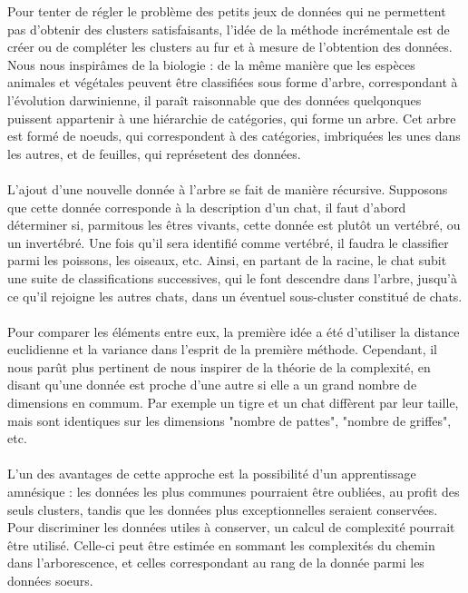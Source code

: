 \documentclass[a4paper,10pt]{article}
\begin{document}
Pour tenter de régler le problème des petits jeux de données qui ne permettent pas d’obtenir des clusters satisfaisants, l’idée de la méthode incrémentale est de créer ou de compléter les clusters au fur et à mesure de l’obtention des données. Nous nous inspirâmes de la biologie : de la même manière que les espèces animales et végétales peuvent être classifiées sous forme d'arbre, correspondant à l'évolution darwinienne, il paraît raisonnable que des données quelqonques puissent appartenir à une hiérarchie de catégories, qui forme un arbre. Cet arbre est formé de noeuds, qui correspondent à des catégories, imbriquées les unes dans les autres, et de feuilles, qui représetent des données.

\paragraph{}

L'ajout d'une nouvelle donnée à l'arbre se fait de manière récursive. Supposons que cette donnée corresponde à la description d'un chat, il faut d'abord déterminer si, parmitous les êtres vivants, cette donnée est plutôt un vertébré, ou un invertébré. Une fois qu'il sera identifié comme vertébré, il faudra le classifier parmi les poissons, les oiseaux, etc. Ainsi, en partant de la racine, le chat subit une suite de classifications successives, qui le font descendre dans l'arbre, jusqu'à ce qu'il rejoigne les autres chats, dans un éventuel sous-cluster constitué de chats.

\paragraph{}

Pour comparer les éléments entre eux, la première idée a été d’utiliser la distance euclidienne et la variance dans l’esprit de la première méthode. Cependant, il nous parût plus pertinent de nous inspirer de la théorie de la complexité, en disant qu'une donnée est proche d'une autre si elle a un grand nombre de dimensions en commum. Par exemple un tigre et un chat diffèrent par leur taille, mais sont identiques sur les dimensions "nombre de pattes", "nombre de griffes", etc.

\paragraph{}

L'un des avantages de cette approche est la possibilité d'un apprentissage amnésique : les données les plus communes pourraient être oubliées, au profit des seuls clusters, tandis que les données plus exceptionnelles seraient conservées. Pour discriminer les données utiles à conserver, un calcul de complexité pourrait être utilisé. Celle-ci peut être estimée en sommant les complexités du chemin dans l'arborescence, et celles correspondant au rang de la donnée parmi les données soeurs. 
\end{document}
